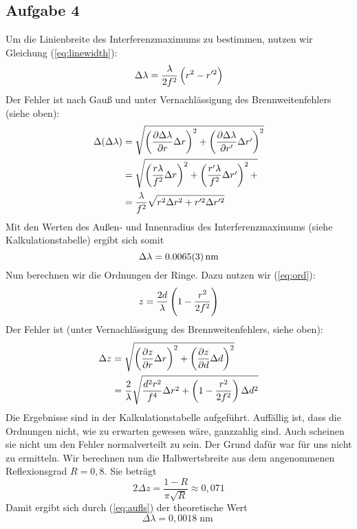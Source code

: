 \documentclass[a4paper,german,12pt,smallheadings]{scrartcl}
\begin{document}
\subsection{Aufgabe 4}
Um die Linienbreite des Interferenzmaximums zu bestimmen, nutzen wir Gleichung
(\ref{eq:linewidth}):
\begin{equation}
\Delta \lambda = \frac{\lambda}{2f^2} \del{r^2 - r'^2}
\end{equation}
Der Fehler ist nach Gauß und unter Vernachlässigung des Brennweitenfehlers
(siehe oben):
\begin{align}
\Delta(\Delta \lambda) &= \sqrt{
\del{\frac{\partial \Delta \lambda}{\partial r} \Delta r}^2 +
\del{\frac{\partial \Delta \lambda}{\partial r'} \Delta r'}^2
} \\
&= \sqrt{
\del{\frac{r \lambda}{f^2} \Delta r}^2 +
\del{\frac{r' \lambda}{f^2} \Delta r'}^2 +
} \\
&= \frac{\lambda}{f^2} \sqrt{
r^2 \Delta r^2 + r'^2 \Delta r'^2
}
\end{align}
Mit den Werten des Außen- und Innenradius des Interferenzmaximums (siehe
Kalkulationstabelle) ergibt sich somit
\begin{equation}
\Delta \lambda = \num{0.0065\pm0.0003} \operatorname{nm}
\end{equation}
Nun berechnen wir die Ordnungen der Ringe. Dazu nutzen wir (\ref{eq:ord}):
\begin{equation}
z = \frac{2d}{\lambda} \del{1 - \frac{r^2}{2f^2}}
\end{equation}
Der Fehler ist (unter Vernachlässigung des Brennweitenfehlers, siehe oben):
\begin{align}
\Delta z &= \sqrt{
\del{\frac{\partial z}{\partial r} \Delta r}^2 +
\del{\frac{\partial z}{\partial d} \Delta d}^2
} \\
&= \frac{2}{\lambda} \sqrt{
\frac{d^2 r^2}{f^4} \Delta r^2 + \del{1 - \frac{r^2}{2f^2}} \Delta d^2
}
\end{align}
Die Ergebnisse sind in der Kalkulationstabelle aufgeführt. Auffällig ist, dass
die Ordnungen nicht, wie zu erwarten gewesen wäre, ganzzahlig sind. Auch
scheinen sie nicht um den Fehler normalverteilt zu sein. Der Grund dafür war
für uns nicht zu ermitteln.
Wir berechnen nun die Halbwertsbreite aus dem angenommenen Reflexionsgrad $R =
0{,}8$. Sie beträgt
\begin{equation}
2 \Delta z = \frac{1 - R}{\pi \sqrt{R}} \approx 0{,}071
\end{equation}
Damit ergibt sich durch (\ref{eq:aufls}) der theoretische Wert
\begin{equation}
\Delta \lambda = 0{,}0018 \operatorname{nm}
\end{equation}
\end{document}
